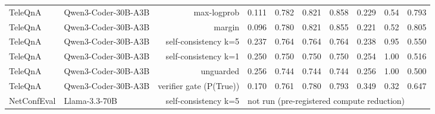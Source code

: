 \begin{tabular}{llrrrrrrrr}
TeleQnA & Qwen3-Coder-30B-A3B & max-logprob & 0.111 & 0.782 & 0.821 & 0.858 & 0.229 & 0.54 & 0.793 \\
TeleQnA & Qwen3-Coder-30B-A3B & margin & 0.096 & 0.780 & 0.821 & 0.855 & 0.221 & 0.52 & 0.805 \\
TeleQnA & Qwen3-Coder-30B-A3B & self-consistency k=5 & 0.237 & 0.764 & 0.764 & 0.764 & 0.238 & 0.95 & 0.550 \\
TeleQnA & Qwen3-Coder-30B-A3B & self-consistency k=1 & 0.250 & 0.750 & 0.750 & 0.750 & 0.254 & 1.00 & 0.516 \\
TeleQnA & Qwen3-Coder-30B-A3B & unguarded & 0.256 & 0.744 & 0.744 & 0.744 & 0.256 & 1.00 & 0.500 \\
TeleQnA & Qwen3-Coder-30B-A3B & verifier gate (P(True)) & 0.170 & 0.761 & 0.780 & 0.793 & 0.349 & 0.32 & 0.647 \\
NetConfEval & Llama-3.3-70B & self-consistency k=5 & \multicolumn{7}{l}{not run (pre-registered compute reduction)} \\
\bottomrule
\end{tabular}
